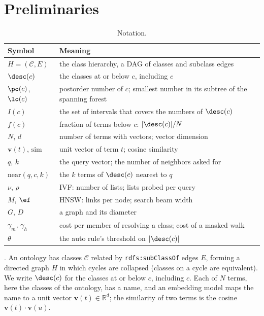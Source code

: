 \section{Preliminaries}
\label{sec-pre}

\begin{table}[t]
\caption{Notation.}
\label{tab-notation}
\small
\begin{tabular}{@{}p{2.1cm}p{5.65cm}@{}}
\toprule
Symbol & Meaning \\
\midrule
$H=(\mathcal{C},E)$ & the class hierarchy, a DAG of classes and subclass edges \\
$\desc(c)$ & the classes at or below $c$, including $c$ \\
$\po(c)$, $\lo(c)$ & postorder number of $c$; smallest number in its subtree of the spanning forest \\
$I(c)$ & the set of intervals that covers the numbers of $\desc(c)$ \\
$f(c)$ & fraction of terms below $c$: $|\desc(c)|/N$ \\
$N$, $d$ & number of terms with vectors; vector dimension \\
$\mathbf{v}(t)$, $\mathrm{sim}$ & unit vector of term $t$; cosine similarity \\
$q$, $k$ & the query vector; the number of neighbors asked for \\
$\mathrm{near}(q,c,k)$ & the $k$ terms of $\desc(c)$ nearest to $q$ \\
$\nu$, $\rho$ & IVF: number of lists; lists probed per query \\
$M$, $\ef$ & HNSW: links per node; search beam width \\
$G$, $D$ & a graph and its diameter \\
$\gamma_m$, $\gamma_h$ & cost per member of resolving a class; cost of a masked walk \\
$\theta$ & the auto rule's threshold on $|\desc(c)|$ \\
\bottomrule
\end{tabular}
\end{table}

.
An ontology has classes $\mathcal{C}$ related by \texttt{rdfs:subClassOf} edges $E$,
forming a directed graph $H$ in which cycles are collapsed (classes on a cycle are
equivalent).
We write $\desc(c)$ for the classes at or below $c$, including $c$.
Each of $N$ terms, here the classes of the ontology, has a name, and an embedding model
maps the name to a unit vector $\mathbf{v}(t)\in\mathbb{R}^d$; the similarity of two
terms is the cosine $\mathbf{v}(t)\cdot\mathbf{v}(u)$.


